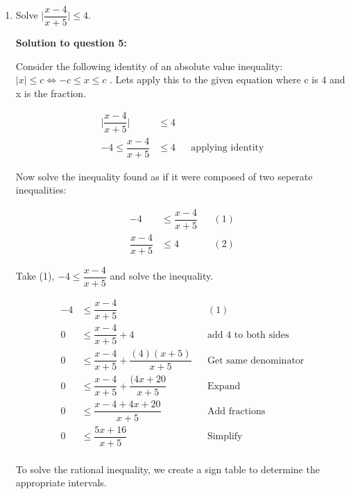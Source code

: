 \documentclass[12pt]{book}
\begin{document}
\begin{enumerate}
\item Solve $\bigg|\dfrac{x-4}{x+5}\bigg| \le 4$.

\vspace{0.3cm} 
\textbf{Solution to question 5:}

\vspace{0.5cm}
 Consider the following identity of an absolute value inequality: $|x| \leq c \Longleftrightarrow -c \leq x \leq c$
 . Lets apply this to the given equation where c is 4 and x is the fraction.
 \vspace{-0.3cm}

 \begin{align*}
    \bigg|\dfrac{x-4}{x+5}\bigg| &\le 4 \\
    -4 \le \dfrac{x-4}{x+5} & \le 4 && \text{applying identity}
 \end{align*}

 \begin{center}
    Now solve the inequality found as if it were composed of two seperate inequalities:
\end{center}
\vspace{-1cm}

\begin{align*}
    -4 &\le \dfrac{x-4}{x+5} && (1)\\
    \dfrac{x-4}{x+5} &\le 4 && (2)
\end{align*}

\vspace{1cm}

Take (1), $-4 \le \dfrac{x-4}{x+5}$ and solve the inequality.

\begin{align*}
    -4 &\le \dfrac{x-4}{x+5} && (1)\\
    0 &\le \dfrac{x-4}{x+5} + 4 && \text{add 4 to both sides} \\
    0 &\le \dfrac{x-4}{x+5} + \dfrac{(4)(x+5)}{x+5} && \text{Get same denominator} \\
    0 &\le \dfrac{x-4}{x+5} + \dfrac{(4x+20}{x+5} && \text{Expand} \\
    0 &\le \dfrac{x-4+4x+20}{x+5} && \text{Add fractions} \\
    0 &\le \dfrac{5x+16}{x+5} && \text{Simplify} \\
\end{align*}

\newpage

\begin{center}
To solve the rational inequality, we create a sign table
 to determine the appropriate intervals.
\end{center}
\vspace{0.5cm}


\end{enumerate}
\end{document}
